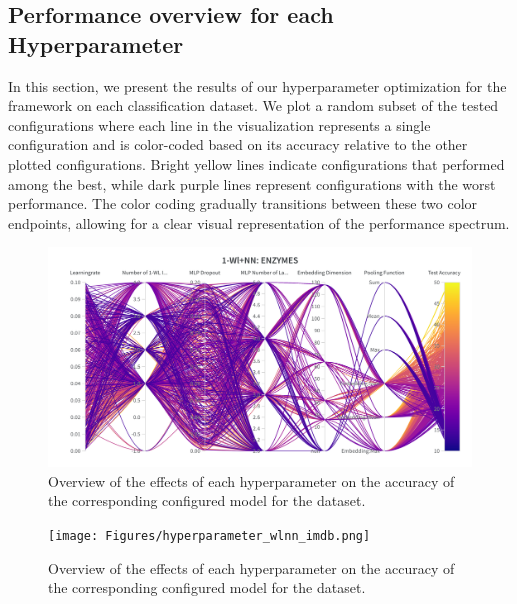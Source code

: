 \subsection{Performance overview for each Hyperparameter}
In this section, we present the results of our hyperparameter optimization for the \wlnn framework on each classification dataset. We plot a random subset of the tested configurations where each line in the visualization represents a single configuration and is color-coded based on its accuracy relative to the other plotted configurations. Bright yellow lines indicate configurations that performed among the best, while dark purple lines represent configurations with the worst performance. The color coding gradually transitions between these two color endpoints, allowing for a clear visual representation of the performance spectrum.

\begin{figure}[H]
    \centering
    \includegraphics[width=\textwidth]{Figures/hyperparameter_wlnn_enzymes.png}
    \vspace*{-30pt}
    \caption{Overview of the effects of each hyperparameter on the accuracy of the corresponding configured \wlnn model for the \enzymes dataset.}
\end{figure}
\vfill
\begin{figure}[H]
    \centering
    \texttt{[image: Figures/hyperparameter\_wlnn\_imdb.png]}
    \caption{Overview of the effects of each hyperparameter on the accuracy of the corresponding configured \wlnn model for the \imdb dataset.}
\end{figure}

